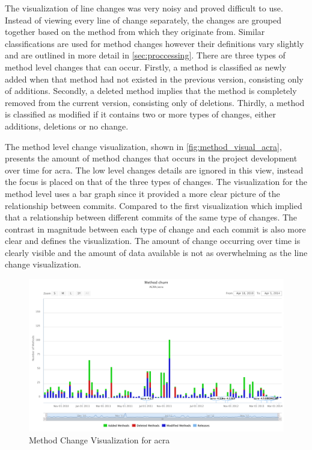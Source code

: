 The visualization of line changes was very noisy and proved difficult to use. Instead of viewing every line of change separately, the changes are grouped together based on the method from which they originate from. Similar classifications are used for method changes however their definitions vary slightly and are outlined in more detail in \autoref{sec:proccessing}. There are three types of method level changes that can occur. Firstly, a method is classified as newly added when that method had not existed in the previous version, consisting only of additions. Secondly, a deleted method implies that the method is completely removed from the current version, consisting only of deletions. Thirdly, a method is classified as modified if it contains two or more types of changes, either additions, deletions or no change.

The method level change visualization, shown in \autoref{fig:method_visual_acra}, presents the amount of method changes that occurs in the project development over time for acra. The low level changes details are ignored in this view, instead the focus is placed on that of the three types of changes. The visualization for the method level uses a bar graph since it provided a more clear picture of the relationship between commits. Compared to the first visualization which implied that a relationship between different commits of the same type of changes. The contrast in magnitude between each type of change and each commit is also more clear and defines the visualization. The amount of change occurring over time is clearly visible and the amount of data available is not as overwhelming as the line change visualization.


\begin{landscape}
\thispagestyle{empty}
 \begin{figure}
  \centering
    \includegraphics[width=1.5\textwidth]{images/method_visual_acra}
    \caption{Method Change Visualization for acra}
    \label{fig:method_visual_acra}
 \end{figure}
\end{landscape}
\thispagestyle{plain}

